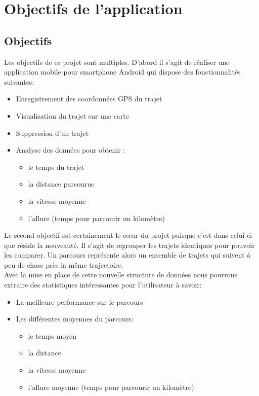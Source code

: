\chapter{Objectifs de l'application}
\section{Objectifs}
Les objectifs de ce projet sont multiples. D'abord il s'agit de réaliser une application mobile pour smartphone Android qui dispose des fonctionnalités suivantes:\\

\begin{itemize}
  \item Enregistrement des coordonnées GPS du trajet
  \item Visualisation du trajet sur une carte 
  \item Suppression d'un trajet 
  \item Analyse des données pour obtenir :
  \begin{itemize}
    \item le temps du trajet
    \item la distance parcourue
    \item la vitesse moyenne
    \item l'allure (temps pour parcourir un kilomètre)
  \end{itemize}
\end{itemize}\bigskip

Le second objectif est certainement le cœur du projet puisque c'est dans celui-ci que réside la nouveauté. Il s'agit de regrouper les trajets identiques pour pouvoir les comparer. Un parcours représente alors un ensemble de trajets qui suivent à peu de chose près la même trajectoire.\\

Avec la mise en place de cette nouvelle structure de données nous pourrons extraire des statistiques intéressantes pour l'utilisateur à savoir:\\

\begin{itemize}
  \item La meilleure performance sur le parcours
  \item Les différentes moyennes du parcours:
  \begin{itemize}
    \item le temps moyen
    \item la distance
    \item la vitesse moyenne
    \item l'allure moyenne (temps pour parcourir un kilomètre)
  \end{itemize}   
\end{itemize}

